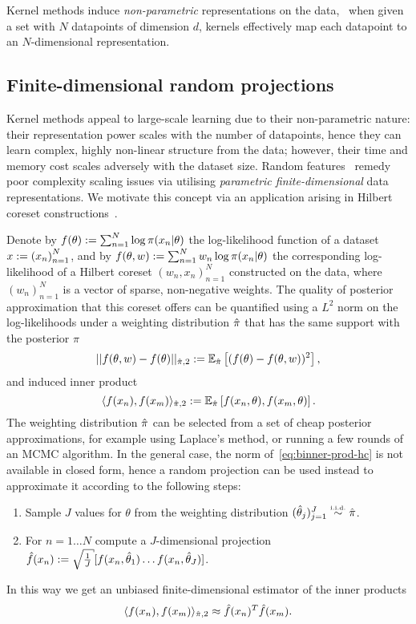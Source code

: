 Kernel methods induce \emph{non-parametric} representations on the data, \ie~when given a set with $ N $ datapoints of dimension $d$, kernels effectively map each datapoint to an $N$-dimensional representation. %

\subsection{Finite-dimensional random projections}
\label{subsec:b-random-features}

Kernel methods appeal to large-scale learning due to their non-parametric nature: their representation power scales with the number of datapoints, hence they can learn complex, highly non-linear structure from the data; however, their time and memory cost scales adversely with the dataset size. Random features~\citep{rahimi08} remedy poor complexity scaling issues via utilising \emph{parametric finite-dimensional} data representations. We motivate this concept via an application arising in Hilbert coreset constructions~\cite{campbell19jmlr}.

Denote by $ f(\theta) := \sum_{n=1}^{N} \log\pi(x_n|\theta) $ the log-likelihood function of a dataset $x := {(x_n)}_{n=1}^{N}$, and by $ f(\theta,w) := \sum_{n=1}^{N} w_n\log\pi(x_n|\theta)$ the corresponding log-likelihood of a Hilbert coreset $(w_n, x_n)_{n=1}^{N}$ constructed on the data, where $(w_n)_{n=1}^{N}$ is a vector of sparse, non-negative weights. The quality of posterior approximation that this coreset offers can be quantified using a $L^2$ norm on the log-likelihoods under a weighting distribution $\hat{\pi}$ that has the same support with the posterior $\pi$ 
\[
||f(\theta, w) - f(\theta)||_{\hat{\pi},2} := \mathbb{E}_{\hat{\pi}} \left[ (f(\theta) - f(\theta, w))^2\right],
\]
and induced inner product
\[
\label{eq:binner-prod-hc}
\langle f(x_n), f(x_m) \rangle_{\hat{\pi}, 2} := \mathbb{E}_{\hat{\pi}}\left[f(x_n, \theta), f(x_m, \theta)\right].
\]
The weighting distribution $\hat{\pi}$ can be selected from a set of cheap posterior approximations, for example using Laplace's method, or running a few rounds of an MCMC algorithm. In the general case, the norm of~\cref{eq:binner-prod-hc} is not available in closed form, hence a random projection can be used instead to approximate it according to the following steps:
\begin{enumerate}
	\item Sample $J$ values for $\theta$ from the weighting distribution $(\htheta_j)_{j=1}^{J} \distiid \hpi$.
	\item For $n=1 \ldots N$ compute a $J$-dimensional projection $ \hf(x_n) \defined \sqrt{\frac{1}{J}}[f(x_n, \htheta_1) \ldots f(x_n, \htheta_J)]$.
\end{enumerate}
In this way we get an unbiased finite-dimensional estimator of the inner products
\[
\langle f(x_n), f(x_m) \rangle_{\hat{\pi}, 2}  \approx \hat{f}(x_n)^T \hat{f}(x_m).
\]


